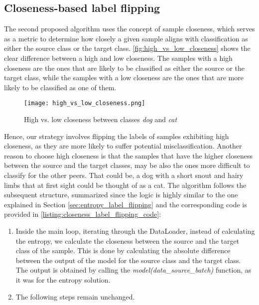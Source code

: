 \subsection{Closeness-based label flipping}\label{sec:closeness_label_flipping}
The second proposed algorithm uses the concept of sample closeness, which serves as a metric to determine how closely a given sample aligns with classification as either the source class or the target class. \autoref{fig:high_vs_low_closeness} shows the clear difference between a high and low closeness. The samples with a high closeness are the ones that are likely to be classified as either the source or the target class, while the samples with a low closeness are the ones that are more likely to be classified as one of them.

\begin{figure}[h!]
        \centering
        \texttt{[image: high\_vs\_low\_closeness.png]}
        \caption{High vs. low closeness between classes \textit{dog} and \textit{cat}}
        \label{fig:high_vs_low_closeness}
\end{figure}

Hence, our strategy involves flipping the labels of samples exhibiting high closeness, as they are more likely to suffer potential misclassification. Another reason to choose high closeness is that the samples that have the higher closeness between the source and the target classes, may be also the ones more difficult to classify for the other peers. That could be, a dog with a short snout and hairy limbs that at first sight could be thought of as a cat.
The algorithm follows the subsequent structure, summarized since the logic is highly similar to the one explained in Section \ref{sec:entropy_label_flipping} and the corresponding code is provided in \autoref{listing:closeness_label_flipping_code}:
\begin{enumerate}
        \item Inside the main loop, iterating through the DataLoader, instead of calculating the entropy, we calculate the closeness between the source and the target class of the sample. This is done by calculating the absolute difference between the output of the model for the source class and the target class. The output is obtained by calling the \textit{model(data\_source\_batch)} function, as it was for the entropy solution.
        \item The following steps remain unchanged.
\end{enumerate}


